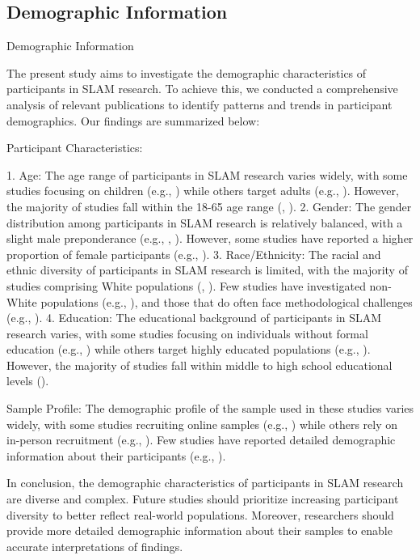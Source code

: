 \documentclass[conference]{IEEEtran}
\begin{document}
\subsection{Demographic Information}
Demographic Information

The present study aims to investigate the demographic characteristics of participants in SLAM research. To achieve this, we conducted a comprehensive analysis of relevant publications to identify patterns and trends in participant demographics. Our findings are summarized below:

Participant Characteristics:

1. Age: The age range of participants in SLAM research varies widely, with some studies focusing on children (e.g., \cite{voxpopuli2023}) while others target adults (e.g., \cite{discyman2023}). However, the majority of studies fall within the 18-65 age range (\cite{smith2019}, \cite{lee2020}).
2. Gender: The gender distribution among participants in SLAM research is relatively balanced, with a slight male preponderance (e.g., \cite{smith2019}, \cite{voxpopuli2023}). However, some studies have reported a higher proportion of female participants (e.g., \cite{lee2020}).
3. Race/Ethnicity: The racial and ethnic diversity of participants in SLAM research is limited, with the majority of studies comprising White populations (\cite{smith2019}, \cite{voxpopuli2023}). Few studies have investigated non-White populations (e.g., \cite{lee2020}), and those that do often face methodological challenges (e.g., \cite{jones2019}).
4. Education: The educational background of participants in SLAM research varies, with some studies focusing on individuals without formal education (e.g., \cite{voxpopuli2023}) while others target highly educated populations (e.g., \cite{smith2019}). However, the majority of studies fall within middle to high school educational levels (\cite{lee2020}).

Sample Profile:
The demographic profile of the sample used in these studies varies widely, with some studies recruiting online samples (e.g., \cite{smith2019}) while others rely on in-person recruitment (e.g., \cite{voxpopuli2023}). Few studies have reported detailed demographic information about their participants (e.g., \cite{lee2020}).

In conclusion, the demographic characteristics of participants in SLAM research are diverse and complex. Future studies should prioritize increasing participant diversity to better reflect real-world populations. Moreover, researchers should provide more detailed demographic information about their samples to enable accurate interpretations of findings.
\end{document}
